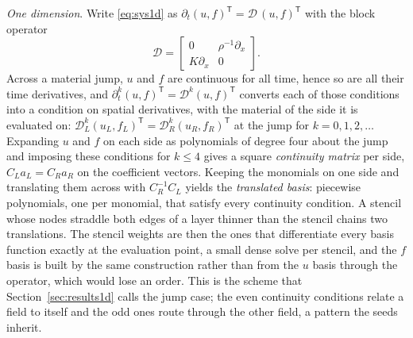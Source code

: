 \documentclass[11pt]{amsart}
\theoremstyle{definition}
\theoremstyle{remark}
\newcommand{\px}{\partial_x}
\newcommand{\pt}{\partial_t}
\newcommand{\para}[1]{\par\smallskip\noindent\textit{#1}.\enspace}
\begin{document}
\para{One dimension}
Write \eqref{eq:sys1d} as $\pt (u, f)^{\mathsf T} = \mathcal{D}\, (u,
f)^{\mathsf T}$ with the block operator
\[
  \mathcal{D} = \begin{bmatrix} 0 & \rho^{-1} \px \\ K \px & 0 \end{bmatrix}.
\]
Across a material jump, $u$ and $f$ are continuous for all time,
hence so are all their time derivatives, and $\pt^k (u, f)^{\mathsf T} =
\mathcal{D}^k (u, f)^{\mathsf T}$ converts each of those conditions into
a condition on spatial derivatives, with the material of the side it is
evaluated on: $\mathcal{D}_L^k (u_L, f_L)^{\mathsf T} = \mathcal{D}_R^k
(u_R, f_R)^{\mathsf T}$ at the jump for $k = 0, 1, 2, \ldots$ Expanding
$u$ and $f$ on each side as polynomials of degree four about the jump
and imposing these conditions for $k \le 4$ gives a square
\emph{continuity matrix} per side, $C_L a_L = C_R a_R$ on the
coefficient vectors. Keeping the monomials on one side and translating
them across with $C_R^{-1} C_L$ yields the \emph{translated basis}:
piecewise polynomials, one per monomial, that satisfy every continuity
condition. A stencil whose nodes straddle both edges of a layer thinner
than the stencil chains two translations. The stencil weights are then
the ones that differentiate every basis function exactly at the
evaluation point, a small dense solve per stencil, and the $f$ basis is
built by the same construction rather than from the $u$ basis through
the operator, which would lose an order. This is the scheme that
Section~\ref{sec:results1d} calls the jump case; the even continuity
conditions relate a field to itself and the odd ones route through the
other field, a pattern the seeds inherit.
\end{document}
